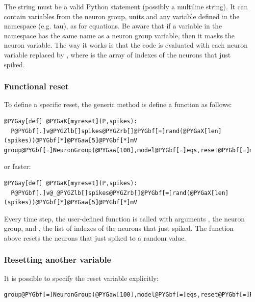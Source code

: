 \documentclass[letterpaper,10pt,english]{manual}
\begin{document}
The string must be a valid Python statement (possibly a multiline string). It can
contain variables from the neuron group, units and any variable defined in the namespace
(e.g. tau), as for equations. Be aware that if a variable in the namespace has the same
name as a neuron group variable, then it masks the neuron variable. The way it works is
that the code is evaluated with each neuron variable  replaced by , where
 is the array of indexes of the neurons that just spiked.


\subsubsection{Functional reset}

To define a specific reset, the generic method is define a function as follows:

\begin{Verbatim}[commandchars=@\[\]]
@PYGay[def] @PYGaK[myreset](P,spikes):
  P@PYGbf[.]v@PYGZlb[]spikes@PYGZrb[]@PYGbf[=]rand(@PYGaX[len](spikes))@PYGbf[*]@PYGaw[5]@PYGbf[*]mV
group@PYGbf[=]NeuronGroup(@PYGaw[100],model@PYGbf[=]eqs,reset@PYGbf[=]myreset,threshold@PYGbf[=]@PYGaw[10]@PYGbf[*]mV)
\end{Verbatim}

or faster:

\begin{Verbatim}[commandchars=@\[\]]
@PYGay[def] @PYGaK[myreset](P,spikes):
  P@PYGbf[.]v@_@PYGZlb[]spikes@PYGZrb[]@PYGbf[=]rand(@PYGaX[len](spikes))@PYGbf[*]@PYGaw[5]@PYGbf[*]mV
\end{Verbatim}

Every time step, the user-defined function is called with arguments
, the neuron group, and , the list of indexes of the neurons that just spiked.
The function above resets the neurons that just spiked to a random value.


\subsubsection{Resetting another variable}

It is possible to specify the reset variable explicitly:

\begin{Verbatim}[commandchars=@\[\]]
group@PYGbf[=]NeuronGroup(@PYGaw[100],model@PYGbf[=]eqs,reset@PYGbf[=]Reset(@PYGaw[0]@PYGbf[*]mV,state@PYGbf[=]@PYGad[']@PYGad[w]@PYGad[']),threshold@PYGbf[=]@PYGaw[10]@PYGbf[*]mV)
\end{Verbatim}
\end{document}
